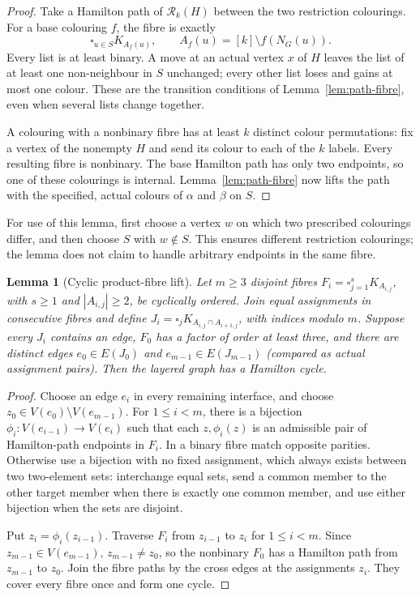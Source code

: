 \documentclass[11pt]{article}
\newtheorem{lemma}[theorem]{Lemma}
\theoremstyle{remark}
\newcommand{\Rk}{\mathcal R_k}
\numberwithin{equation}{section}
\numberwithin{table}{section}
\begin{document}
\begin{proof}
Take a Hamilton path of $\Rk(H)$ between the two restriction
colourings.  For a base colouring $f$, the fibre is exactly
\[
 \square_{u\in S}K_{A_f(u)},\qquad
 A_f(u)=[k]\setminus f(N_G(u)).
\]
Every list is at least binary.  A move at an actual vertex $x$ of $H$
leaves the list of at least one non-neighbour in $S$ unchanged; every
other list loses and gains at most one colour.  These are the transition
conditions of Lemma~\ref{lem:path-fibre}, even when several lists
change together.

A colouring with a nonbinary fibre has at least $k$ distinct colour
permutations: fix a vertex of the nonempty $H$ and send its colour to
each of the $k$ labels.  Every resulting fibre is nonbinary.  The base
Hamilton path has only two endpoints, so one of these colourings is
internal.  Lemma~\ref{lem:path-fibre} now lifts the path with the
specified, actual colours of $\alpha$ and $\beta$ on $S$.
\end{proof}

For use of this lemma, first choose a vertex $w$ on which two prescribed
colourings differ, and then choose $S$ with $w\notin S$.  This ensures
different restriction colourings; the lemma does not claim to handle
arbitrary endpoints in the same fibre.

\begin{lemma}[Cyclic product-fibre lift]
\label{lem:fibre-lift}
Let $m\ge3$ disjoint fibres
$F_i=\square_{j=1}^sK_{A_{i,j}}$, with $s\ge1$ and
$|A_{i,j}|\ge2$, be cyclically ordered.  Join equal assignments in
consecutive fibres and define
$J_i=\square_j K_{A_{i,j}\cap A_{i+1,j}}$, with indices modulo $m$.
Suppose every $J_i$ contains an edge, $F_0$ has a factor of order at
least three, and there are distinct edges
$e_0\in E(J_0)$ and $e_{m-1}\in E(J_{m-1})$ (compared as actual
assignment pairs).  Then the layered graph has a Hamilton cycle.
\end{lemma}

\begin{proof}
Choose an edge $e_i$ in every remaining interface, and choose
$z_0\in V(e_0)\setminus V(e_{m-1})$.  For $1\le i<m$, there is a
bijection $\phi_i:V(e_{i-1})\to V(e_i)$ such that each
$z,\phi_i(z)$ is an admissible pair of Hamilton-path endpoints in
$F_i$.  In a binary fibre match opposite parities.  Otherwise use a
bijection with no fixed assignment, which always exists between two
two-element sets: interchange equal sets, send a common member to the
other target member when there is exactly one common member, and use
either bijection when the sets are disjoint.

Put $z_i=\phi_i(z_{i-1})$.  Traverse $F_i$ from $z_{i-1}$ to $z_i$
for $1\le i<m$.  Since $z_{m-1}\in V(e_{m-1})$,
$z_{m-1}\ne z_0$, so the nonbinary $F_0$ has a Hamilton path from
$z_{m-1}$ to $z_0$.  Join the fibre paths by the cross edges at the
assignments $z_i$.  They cover every fibre once and form one cycle.
\end{proof}
\end{document}
